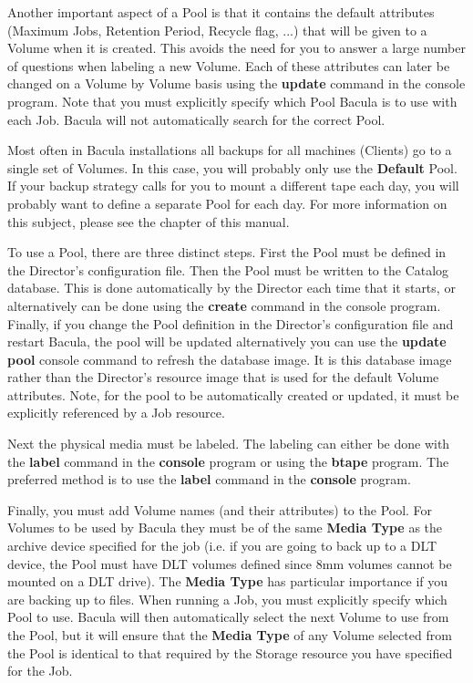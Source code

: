 Another important aspect of a Pool is that it contains the default attributes
(Maximum Jobs, Retention Period, Recycle flag, ...) that will be given to a
Volume when it is created. This avoids the need for you to answer a large
number of questions when labeling a new Volume. Each of these attributes can
later be changed on a Volume by Volume basis using the {\bf update} command in
the console program. Note that you must explicitly specify which Pool Bacula
is to use with each Job. Bacula will not automatically search for the correct
Pool. 

Most often in Bacula installations all backups for all machines (Clients) go
to a single set of Volumes. In this case, you will probably only use the {\bf
Default} Pool. If your backup strategy calls for you to mount a different tape
each day, you will probably want to define a separate Pool for each day. For
more information on this subject, please see the 
 chapter of this
manual. 

To use a Pool, there are three distinct steps. First the Pool must be defined
in the Director's configuration file. Then the Pool must be written to the
Catalog database. This is done automatically by the Director each time that it
starts, or alternatively can be done using the {\bf create} command in the
console program. Finally, if you change the Pool definition in the Director's
configuration file and restart Bacula, the pool will be updated alternatively
you can use the {\bf update pool} console command to refresh the database
image. It is this database image rather than the Director's resource image
that is used for the default Volume attributes. Note, for the pool to be
automatically created or updated, it must be explicitly referenced by a Job
resource. 

Next the physical media must be labeled. The labeling can either be done with
the {\bf label} command in the {\bf console} program or using the {\bf btape}
program. The preferred method is to use the {\bf label} command in the {\bf
console} program. 

Finally, you must add Volume names (and their attributes) to the Pool. For
Volumes to be used by Bacula they must be of the same {\bf Media Type} as the
archive device specified for the job (i.e. if you are going to back up to a
DLT device, the Pool must have DLT volumes defined since 8mm volumes cannot be
mounted on a DLT drive). The {\bf Media Type} has particular importance if you
are backing up to files. When running a Job, you must explicitly specify which
Pool to use. Bacula will then automatically select the next Volume to use from
the Pool, but it will ensure that the {\bf Media Type} of any Volume selected
from the Pool is identical to that required by the Storage resource you have
specified for the Job. 

